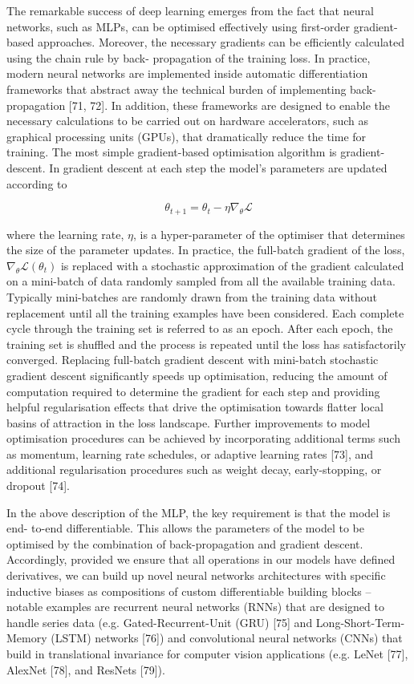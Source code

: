 The remarkable success of deep learning emerges from the fact that neural networks, such as MLPs, can be optimised effectively using first-order gradient-based approaches. Moreover, the necessary gradients can be efficiently calculated using the chain rule by back- propagation of the training loss. In practice, modern neural networks are implemented inside automatic differentiation frameworks that abstract away the technical burden of implementing back-propagation [71, 72]. In addition, these frameworks are designed to enable the necessary calculations to be carried out on hardware accelerators, such as graphical processing units (GPUs), that dramatically reduce the time for training.
The most simple gradient-based optimisation algorithm is gradient-descent. In gradient descent at each step the model’s parameters are updated according to

\begin{equation}
    \theta_{t+1} = \theta_t - \eta \nabla_{\theta} \mathcal{L}
\end{equation}

where the learning rate, $\eta$, is a hyper-parameter of the optimiser that determines the size of the parameter updates. In practice, the full-batch gradient of the loss, $\nabla_{\theta}\mathcal{L}(\theta_{t})$ is replaced with a stochastic approximation of the gradient calculated on a mini-batch of data randomly sampled from all the available training data. Typically mini-batches are randomly drawn from the training data without replacement until all the training examples have been considered. Each complete cycle through the training set is referred to as an epoch. After each epoch, the training set is shuffled and the process is repeated until the loss has satisfactorily converged. Replacing full-batch gradient descent with mini-batch stochastic gradient descent significantly speeds up optimisation, reducing the amount of computation required to determine the gradient for each step and providing helpful regularisation effects that drive the optimisation towards flatter local basins of attraction in the loss landscape. Further improvements to model optimisation procedures can be achieved by incorporating additional terms such as momentum, learning rate schedules, or adaptive learning rates [73], and additional regularisation procedures such as weight decay, early-stopping, or dropout [74].

In the above description of the MLP, the key requirement is that the model is end- to-end differentiable. This allows the parameters of the model to be optimised by the combination of back-propagation and gradient descent. Accordingly, provided we ensure that all operations in our models have defined derivatives, we can build up novel neural networks architectures with specific inductive biases as compositions of custom differentiable building blocks – notable examples are recurrent neural networks (RNNs) that are designed to handle series data (e.g. Gated-Recurrent-Unit (GRU) [75] and Long-Short-Term-Memory (LSTM) networks [76]) and convolutional neural networks
(CNNs) that build in translational invariance for computer vision applications (e.g. LeNet [77], AlexNet [78], and ResNets [79]).

